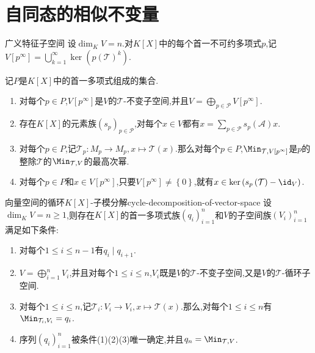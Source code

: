 \section{自同态的相似不变量}

\begin{definition}{广义特征子空间}{}
	设$\dim_{K}V=n$.对$K[X]$中的每个首一不可约多项式$p$,记$V[p^{\infty}]=\bigcup\limits_{k=1}^{\infty}\ker\left(p\left(\mathcal{T}\right)^{k}\right)$.
\end{definition}

\begin{remark}{}{}
	记$P$是$K[X]$中的首一多项式组成的集合.
	\begin{enumerate}
		\item 对每个$p\in P$,$V[p^{\infty}]$是$V$的$\mathcal{T}$-不变子空间,并且$V=\bigoplus\limits_{p\in\mathcal{P}}V[p^{\infty}]$.
		\item 存在$K[X]$的元素族$\left(s_{p}\right)_{p\in\mathcal{P}}$,对每个$x\in V$都有$x=\sum\limits_{p\in\mathcal{P}}s_{p}\left(\mathcal{A}\right)x$.
		\item 对每个$p\in P$,记$\mathcal{T}_{p}:M_{p}\to M_{p},x\mapsto\mathcal{T}\left(x\right)$.那么对每个$p\in P$,$\Min_{\mathcal{T},V[p^{\infty}]}$是$p$的整除$\mathcal{T}$的$\Min_{\mathcal{T},V}$的最高次幂.
		\item 对每个$p\in P$和$x\in V[p^{\infty}]$,只要$V[p^{\infty}]\neq\left\{0\right\}$,就有$x\in\ker\left(s_{p}\left(\mathcal{T}\right)-\id_{V}\right)$.
	\end{enumerate}
\end{remark}

\begin{proposition}{向量空间的循环$K[X]$-子模分解}{cycle-decomposition-of-vector-space}
	设$\dim_{K}V=n\geq 1$,则存在$K[X]$的首一多项式族$\left(q_{i}\right)_{i=1}^{n}$和$V$的子空间族$\left(V_{i}\right)_{i=1}^{n}$满足如下条件:
	\begin{enumerate}
		\item 对每个$1\leq i\leq n-1$有$q_{i}\mid q_{i+1}$.
		\item $V=\bigoplus\limits_{i=1}^{n}V_{i}$,并且对每个$1\leq i\leq n$,$V_{i}$既是$V$的$\mathcal{T}$-不变子空间,又是$V$的$\mathcal{T}$-循环子空间.
		\item 对每个$1\leq i\leq n$,记$\mathcal{T}_{i}:V_{i}\to V_{i},x\mapsto\mathcal{T}\left(x\right)$.那么,对每个$1\leq i\leq n$有$\Min_{\mathcal{T}_{i},V_{i}}=q_{i}$.
		\item 序列$\left(q_{i}\right)_{i=1}^{n}$被条件(1)(2)(3)唯一确定,并且$q_{n}=\Min_{\mathcal{T},V}$.
	\end{enumerate}
\end{proposition}

